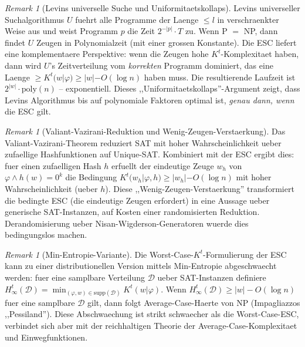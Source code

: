 \documentclass[aps,prd,twocolumn,superscriptaddress,nofootinbib]{revtex4-2}
\theoremstyle{definition}
\theoremstyle{remark}
\newtheorem{remark}[theorem]{Remark}
\begin{document}
\begin{remark}[Levins universelle Suche und Uniformitaetskollaps]
\label{rem:levin-uniformity}
Levins universeller Suchalgorithmus $U$ fuehrt alle Programme der Laenge $\leq l$ in verschraenkter Weise aus und weist Programm $p$ die Zeit $2^{-|p|} \cdot T$ zu. Wenn P $=$ NP, dann findet $U$ Zeugen in Polynomialzeit (mit einer grossen Konstante). Die ESC liefert eine komplementaere Perspektive: wenn die Zeugen hohe $K^t$-Komplexitaet haben, dann wird $U$'s Zeitverteilung vom \emph{korrekten} Programm dominiert, das eine Laenge $\geq K^t(w|\varphi) \geq |w| - O(\log n)$ haben muss. Die resultierende Laufzeit ist $2^{|w|} \cdot \mathrm{poly}(n)$ -- exponentiell. Dieses ,,Uniformitaetskollaps''-Argument zeigt, dass Levins Algorithmus bis auf polynomiale Faktoren optimal ist, \emph{genau dann, wenn} die ESC gilt.
\end{remark}

\begin{remark}[Valiant-Vazirani-Reduktion und Wenig-Zeugen-Verstaerkung]
\label{rem:valiant-vazirani}
Das Valiant-Vazirani-Theorem reduziert SAT mit hoher Wahrscheinlichkeit ueber zufaellige Hashfunktionen auf Unique-SAT. Kombiniert mit der ESC ergibt dies: fuer einen zufaelligen Hash $h$ erfuellt der eindeutige Zeuge $w_h$ von $\varphi \wedge h(w) = 0^k$ die Bedingung $K^t(w_h | \varphi, h) \geq |w_h| - O(\log n)$ mit hoher Wahrscheinlichkeit (ueber $h$). Diese ,,Wenig-Zeugen-Verstaerkung'' transformiert die bedingte ESC (die eindeutige Zeugen erfordert) in eine Aussage ueber generische SAT-Instanzen, auf Kosten einer randomisierten Reduktion. Derandomisierung ueber Nisan-Wigderson-Generatoren wuerde dies bedingungslos machen.
\end{remark}

\begin{remark}[Min-Entropie-Variante]
\label{rem:min-entropy}
Die Worst-Case-$K^t$-Formulierung der ESC kann zu einer distributionellen Version mittels Min-Entropie abgeschwaecht werden: fuer eine samplbare Verteilung $\mathcal{D}$ ueber SAT-Instanzen definiere $H_\infty^t(\mathcal{D}) = \min_{(\varphi, w) \in \mathrm{supp}(\mathcal{D})} K^t(w | \varphi)$. Wenn $H_\infty^t(\mathcal{D}) \geq |w| - O(\log n)$ fuer eine samplbare $\mathcal{D}$ gilt, dann folgt Average-Case-Haerte von NP (Impagliazzos ,,Pessiland''). Diese Abschwae\-chung ist strikt schwaecher als die Worst-Case-ESC, verbindet sich aber mit der reichhaltigen Theorie der Average-Case-Komplexitaet und Einwegfunktionen.
\end{remark}
\end{document}
